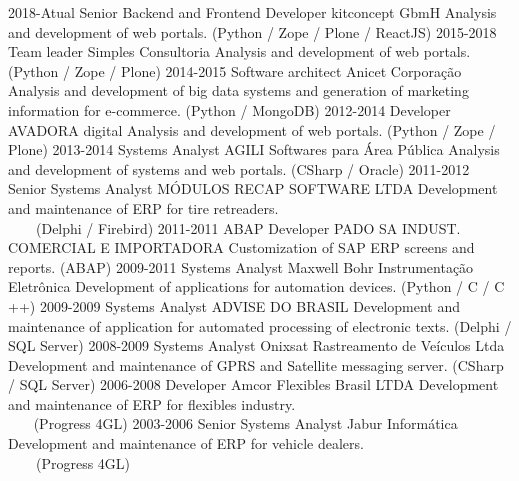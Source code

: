 \documentclass[]{twentysecondcv_en}
\begin{document}
\begin{twenty}
  \twentyitem
    {2018-Atual}
    {Senior Backend and Frontend Developer}
    {kitconcept GbmH}
    {Analysis and development of web portals. (Python / Zope / Plone / ReactJS)}
  \twentyitem
    {2015-2018}
    {Team leader}
    {Simples Consultoria}
    {Analysis and development of web portals. (Python / Zope / Plone)}
  \twentyitem
    {2014-2015}
    {Software architect}
    {Anicet Corporação}
    {Analysis and development of big data systems and generation of marketing information for e-commerce. (Python / MongoDB)}
  \twentyitem
    {2012-2014}
    {Developer}
    {AVADORA digital}
    {Analysis and development of web portals. (Python / Zope / Plone)}
  \twentyitem
    {2013-2014}
    {Systems Analyst}
    {AGILI Softwares para Área Pública}
    {Analysis and development of systems and web portals. (CSharp / Oracle)}
  \twentyitem
    {2011-2012}
    {Senior Systems Analyst}
    {MÓDULOS RECAP SOFTWARE LTDA}
    {Development and maintenance of ERP for tire retreaders. \\
    (Delphi / Firebird)}
  \twentyitem
    {2011-2011}
    {ABAP Developer}
    {PADO SA INDUST. COMERCIAL E IMPORTADORA}
    {Customization of SAP ERP screens and reports. (ABAP)}
  \twentyitem
    {2009-2011}
    {Systems Analyst}
    {Maxwell Bohr Instrumentação Eletrônica}
    {Development of applications for automation devices. (Python / C / C ++)}
  \twentyitem
    {2009-2009}
    {Systems Analyst}
    {ADVISE DO BRASIL}
    {Development and maintenance of application for automated processing of electronic texts. (Delphi / SQL Server)}
  \twentyitem
    {2008-2009}
    {Systems Analyst}
    {Onixsat Rastreamento de Veículos Ltda}
    {Development and maintenance of GPRS and Satellite messaging server. (CSharp / SQL Server)}
  \twentyitem
    {2006-2008}
    {Developer}
    {Amcor Flexibles Brasil LTDA}
    {Development and maintenance of ERP for flexibles industry. \\
    (Progress 4GL)}
  \twentyitem
    {2003-2006}
    {Senior Systems Analyst}
    {Jabur Informática}
    {Development and maintenance of ERP for vehicle dealers. \\
    (Progress 4GL)}
\end{twenty}
\end{document}
